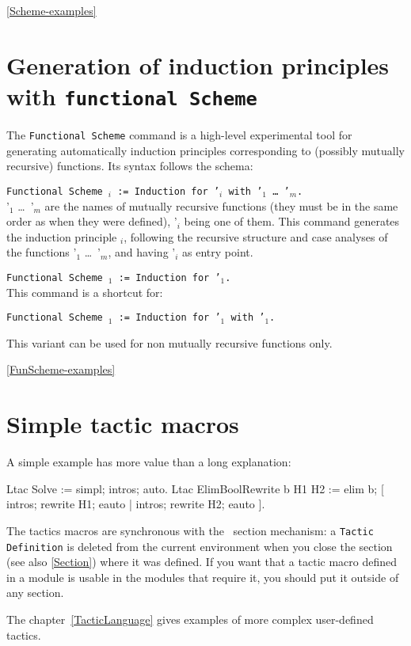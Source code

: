 \SeeAlso \ref{Scheme-examples}


\section{Generation of induction principles with {\tt functional Scheme}}
\label{FunScheme}

The {\tt Functional Scheme} command is a high-level experimental
tool for generating automatically induction principles
corresponding to (possibly mutually recursive) functions.  Its
syntax follows the schema:\bigskip

\noindent
{\tt Functional Scheme {\ident$_i$} := Induction for
    \ident'$_i$ with \ident'$_1$ \dots\ \ident'$_m$.}\\
  
  \ident'$_1$ \dots\ \ident'$_m$ are the names of mutually
  recursive functions (they must be in the same order as when
  they were defined), \ident'$_i$ being one of them. This command
  generates the induction principle \ident$_i$, following the
  recursive structure and case analyses of the functions
  \ident'$_1$ \dots\ \ident'$_m$, and having \ident'$_i$ as entry
  point.

\begin{Variants}
\item {\tt Functional Scheme {\ident$_1$} := Induction for \ident'$_1$.}\\
  
  This command is a shortcut for:
  
  {\tt Functional Scheme {\ident$_1$} := Induction for
    \ident'$_1$ with \ident'$_1$.}

  This variant can be used for non mutually recursive functions only.
\end{Variants}

\SeeAlso \ref{FunScheme-examples}


\section{Simple tactic macros}
\label{TacticDefinition}

A simple example has more value than a long explanation: 

\begin{coq_example}
Ltac Solve := simpl; intros; auto.
Ltac ElimBoolRewrite b H1 H2 :=
  elim b; [ intros; rewrite H1; eauto | intros; rewrite H2; eauto ].
\end{coq_example}

The tactics macros are synchronous with the \Coq\ section mechanism:
a \texttt{Tactic Definition} is deleted from the current environment
when you close the section (see also \ref{Section}) 
where it was defined. If you want that a
tactic macro defined in a module is usable in the modules that
require it, you should put it outside of any section.

The chapter~\ref{TacticLanguage} gives examples of more complex
user-defined tactics.



